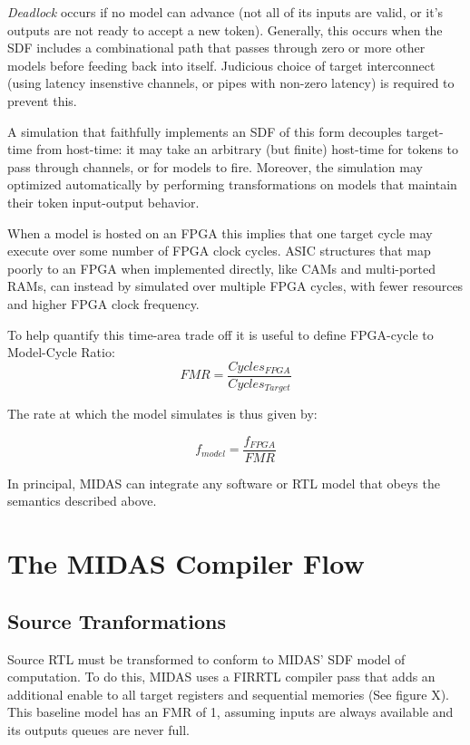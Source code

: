 \emph{Deadlock} occurs if no model can advance (not all of its inputs are
valid, or it's outputs are not ready to accept a new token). Generally, this
occurs when the SDF includes a combinational path that passes through zero
or more other models before feeding back into itself.  Judicious choice of target interconnect (using
latency insenstive channels, or pipes with non-zero latency) is required to
prevent this.

A simulation that faithfully implements an SDF of this form decouples
target-time from host-time: it may take an arbitrary (but finite) host-time for
tokens to pass through channels, or for models to fire.  Moreover, the
simulation may optimized automatically by performing transformations on models
that maintain their token input-output behavior.

When a model is hosted on an FPGA this implies that one target cycle may
execute over some number of FPGA clock cycles.  ASIC structures that map poorly
to an FPGA when implemented directly, like CAMs and multi-ported RAMs, can
instead by simulated over multiple FPGA cycles, with fewer resources and higher
FPGA clock frequency.


To help quantify this time-area trade off it is useful to define FPGA-cycle to Model-Cycle Ratio\cite{APorts}:
$$ FMR = \frac{Cycles_{FPGA}}{Cycles_{Target}} $$

\noindent The rate at which the model simulates is thus given by:

$$ f_{model} = \frac{f_{FPGA}}{FMR} $$

In principal, MIDAS can integrate any software or RTL model that obeys the semantics described above.


\section{The MIDAS Compiler Flow}


\subsection{Source Tranformations}

Source RTL must be transformed to conform to MIDAS' SDF model of computation.
To do this, MIDAS uses a FIRRTL compiler pass that adds an additional enable to
all target registers and sequential memories \TODO(See figure X). This baseline
model has an FMR of 1, assuming inputs are always available and its outputs
queues are never full.

